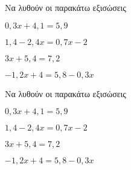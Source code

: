 Να λυθούν οι παρακάτω εξισώσεις
\begin{alist}
\item $ 0{,}3x+4{,}1=5{,}9 $
\item $ 1{,}4-2{,}4x=0{,}7x-2 $
\item $ 3x+5{,}4=7{,}2 $
\item $ -1{,}2x+4=5{,}8-0{,}3x $
\end{alist}
Να λυθούν οι παρακάτω εξισώσεις
\begin{alist}
\item $ 0{,}3x+4{,}1=5{,}9 $
\item $ 1{,}4-2{,}4x=0{,}7x-2 $
\item $ 3x+5{,}4=7{,}2 $
\item $ -1{,}2x+4=5{,}8-0{,}3x $
\end{alist}
